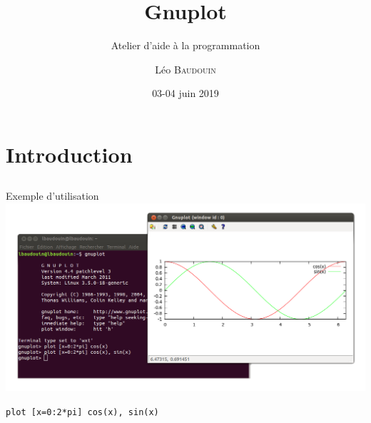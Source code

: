 \documentclass{beamer}
\title{Gnuplot}
\subtitle{Atelier d'aide à la programmation}
\author{L\'eo \textsc{Baudouin}}
\institute{
  {\url{baudouin.leo @ gmail.com}}
}
\date{03-04 juin 2019}
\begin{document}
\begin{frame}
  \titlepage
\end{frame}

\section{Introduction}
\subsection{}

\begin{frame}{Exemple d'utilisation}
\includegraphics[width=\linewidth]{images/gnuplot-exemple}

\begin{center}
\verb?plot [x=0:2*pi] cos(x), sin(x)?
\end{center}
\end{frame}
\end{document}
